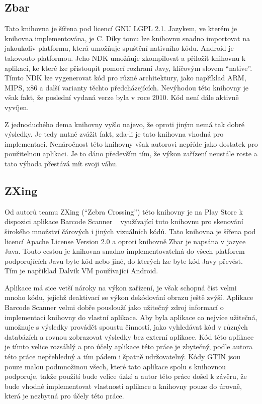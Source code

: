 \documentclass[thesis=B,czech]{FITthesis}[2013/10/20]
\begin{document}
\subsection{Zbar ~\cite{zbar}}

Tato knihovna je šířena pod licencí GNU LGPL 2.1. Jazykem, ve kterém je knihovna implementována, je C. Díky tomu lze knihovnu snadno importovat na jakoukoliv platformu, která umožňuje spuštění nativního kódu. Android je takovouto platformou. Jeho NDK umožňuje zkompilovat a přiložit knihovnu k aplikaci, ke které lze přistoupit pomocí rozhraní Javy, klíčovým slovem ``native''. Tímto NDK lze vygenerovat kód pro různé architektury, jako například ARM, MIPS, x86 a další varianty těchto předcházejících. Nevýhodou této knihovny je však fakt, že poslední vydaná verze byla v roce 2010. Kód není dále aktivně vyvíjen.

Z jednoduchého dema knihovny vyšlo najevo, že oproti jiným nemá tak dobré výsledky. Je tedy nutné zvážit fakt, zda-li je tato knihovna vhodná pro implementaci. Nenáročnost této knihovny však autorovi nepříde jako dostatek pro použitelnou aplikaci. Je to dáno především tím, že výkon zařízení neustále roste a tato výhoda přestává mít svoji váhu.

\subsection{ZXing ~\cite{zxing}}

Od autorů teamu ZXing (``Zebra Crossing'') této knihovny je na Play Store k dispozici aplikace Barcode Scanner ~\cite{barcode_scanner} využívající tuto knihovnu pro skenování širokého množství čárových i jiných vizuálních kódů. Tato knihovna je šířena pod licencí Apache License Version 2.0 a oproti knihovně Zbar je napsána v jazyce Java. Touto cestou je knihovna snadno implementovatelná do všech platforem podporujících Javu byte kód nebo jiné, do kterých lze byte kód Javy převést. Tím je například Dalvik VM používající Android.

Aplikace má sice vetší nároky na výkon zařízení, je však schopná číst velmi mnoho kódu, jejichž deaktivací se výkon dekódování obrazu ještě zvýší. Aplikace Barcode Scanner velmi dobře pouslouží jako užitečný zdroj informací o implementaci knihovny do vlastní aplikace. Aby byla aplikace co nejvíce užitečná, umožnuje s výsledky provádět spoustu činností, jako vyhledávat kód v různých databázích a rovnou zobrazovat výsledky bez externí aplikace. Kód této aplikace je tímto velice rozsáhlý a pro účely aplikace této práce je zbytečný, podle autora této práce nepřehledný a tím pádem i špatně udržovatelný. Kódy GTIN jsou pouze malou podmnožinou všech, které tato aplikace spolu s knihovnou podporuje, takže použití bude velice úzké a autor této práce došel k závěru, že bude vhodné implementovat vlastnosti aplikace a knihovny pouze do úrovně, která je nezbytná pro účely této práce.
\end{document}
